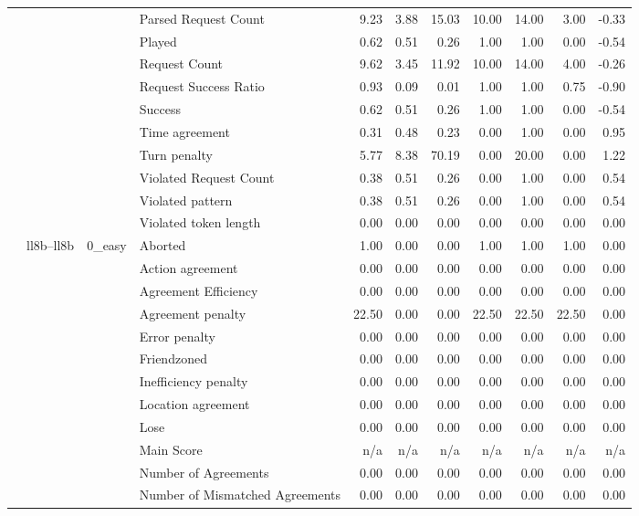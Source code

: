 \begin{tabular}{llllrrrrrrr}
 &  &  & Parsed Request Count & 9.23 & 3.88 & 15.03 & 10.00 & 14.00 & 3.00 & -0.33 \\
 &  &  & Played & 0.62 & 0.51 & 0.26 & 1.00 & 1.00 & 0.00 & -0.54 \\
 &  &  & Request Count & 9.62 & 3.45 & 11.92 & 10.00 & 14.00 & 4.00 & -0.26 \\
 &  &  & Request Success Ratio & 0.93 & 0.09 & 0.01 & 1.00 & 1.00 & 0.75 & -0.90 \\
 &  &  & Success & 0.62 & 0.51 & 0.26 & 1.00 & 1.00 & 0.00 & -0.54 \\
 &  &  & Time agreement & 0.31 & 0.48 & 0.23 & 0.00 & 1.00 & 0.00 & 0.95 \\
 &  &  & Turn penalty & 5.77 & 8.38 & 70.19 & 0.00 & 20.00 & 0.00 & 1.22 \\
 &  &  & Violated Request Count & 0.38 & 0.51 & 0.26 & 0.00 & 1.00 & 0.00 & 0.54 \\
 &  &  & Violated pattern & 0.38 & 0.51 & 0.26 & 0.00 & 1.00 & 0.00 & 0.54 \\
 &  &  & Violated token length & 0.00 & 0.00 & 0.00 & 0.00 & 0.00 & 0.00 & 0.00 \\
\cline{2-11} \cline{3-11}
 & \multirow[t]{378}{*}{ll8b--ll8b} & \multirow[t]{27}{*}{0_easy} & Aborted & 1.00 & 0.00 & 0.00 & 1.00 & 1.00 & 1.00 & 0.00 \\
 &  &  & Action agreement & 0.00 & 0.00 & 0.00 & 0.00 & 0.00 & 0.00 & 0.00 \\
 &  &  & Agreement Efficiency & 0.00 & 0.00 & 0.00 & 0.00 & 0.00 & 0.00 & 0.00 \\
 &  &  & Agreement penalty & 22.50 & 0.00 & 0.00 & 22.50 & 22.50 & 22.50 & 0.00 \\
 &  &  & Error penalty & 0.00 & 0.00 & 0.00 & 0.00 & 0.00 & 0.00 & 0.00 \\
 &  &  & Friendzoned & 0.00 & 0.00 & 0.00 & 0.00 & 0.00 & 0.00 & 0.00 \\
 &  &  & Inefficiency penalty & 0.00 & 0.00 & 0.00 & 0.00 & 0.00 & 0.00 & 0.00 \\
 &  &  & Location agreement & 0.00 & 0.00 & 0.00 & 0.00 & 0.00 & 0.00 & 0.00 \\
 &  &  & Lose & 0.00 & 0.00 & 0.00 & 0.00 & 0.00 & 0.00 & 0.00 \\
 &  &  & Main Score & n/a & n/a & n/a & n/a & n/a & n/a & n/a \\
 &  &  & Number of Agreements & 0.00 & 0.00 & 0.00 & 0.00 & 0.00 & 0.00 & 0.00 \\
 &  &  & Number of Mismatched Agreements & 0.00 & 0.00 & 0.00 & 0.00 & 0.00 & 0.00 & 0.00 \\

\end{tabular}
